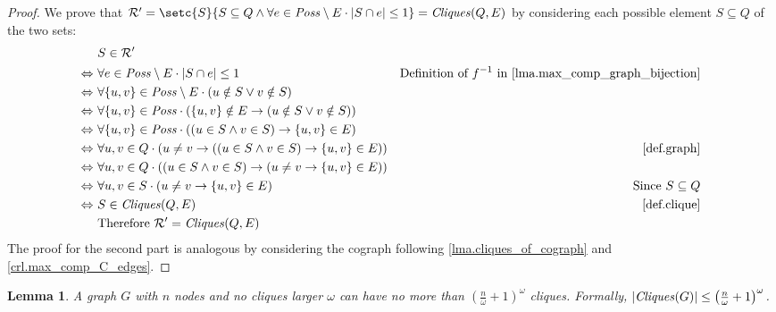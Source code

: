 \documentclass{report}
\DeclarePairedDelimiter{\set}{\{}{\}}
\DeclarePairedDelimiter{\abs}{\lvert}{\rvert}
\DeclarePairedDelimiter{\bracks}{(}{)}
\newtheorem{lemma}[theorem]{Lemma}
\theoremstyle{definition}
\begin{document}
\begin{proof}
We prove that $\mathcal{R}' = \setc{S}{S \subseteq Q \wedge
\forall e \in \mathit{Poss} \setminus E \cdot \abs{S \cap e} \leq 1} =
\mathit{Cliques}(Q, E)$ by considering each possible element $S \subseteq Q$ of the two sets:
\begin{align*}
& S \in \mathcal{R}' \\
\Leftrightarrow \ & \forall e \in \mathit{Poss} \setminus E \cdot \abs{S \cap e} \leq 1
& \text{Definition of } f^{-1} \text{ in \cref{lma.max_comp_graph_bijection}} \\
\Leftrightarrow \ & \forall \set{u, v} \in \mathit{Poss} \setminus E \cdot
(u \notin S \vee v \notin S) \\
\Leftrightarrow \ & \forall \set{u, v} \in \mathit{Poss} \cdot
(\set{u, v} \notin E \rightarrow (u \notin S \vee v \notin S)) \\
\Leftrightarrow \ & \forall \set{u, v} \in \mathit{Poss} \cdot
((u \in S \wedge v \in S) \rightarrow \set{u, v} \in E) \\
\Leftrightarrow \ & \forall u, v \in Q \cdot
(u \neq v \rightarrow ((u \in S \wedge v \in S) \rightarrow \set{u, v} \in E))
& \text{\cref{def.graph}} \\
\Leftrightarrow \ & \forall u, v \in Q \cdot
((u \in S \wedge v \in S) \rightarrow (u \neq v \rightarrow \set{u, v} \in E)) \\
\Leftrightarrow \ & \forall u, v \in S \cdot
(u \neq v \rightarrow \set{u, v} \in E)
& \text{Since } S \subseteq Q \\
\Leftrightarrow \ & S \in \mathit{Cliques}(Q, E)
& \text{\cref{def.clique}} \\
& \text{Therefore } \mathcal{R}' = \mathit{Cliques}(Q, E)
\end{align*}
The proof for the second part is analogous by considering the cograph
following \cref{lma.cliques_of_cograph} and \cref{crl.max_comp_C_edges}.
\end{proof}

\begin{lemma} \label{lma.num_cliques}
A graph $G$ with $n$ nodes and no cliques larger $\omega$ can have 
no more than $(\frac{n}{\omega} + 1)^\omega$ cliques. Formally,
$\abs{\mathit{Cliques}(G)} \leq \bracks*{\frac{n}{\omega} + 1}^{\omega}$.
\end{lemma}
\end{document}
